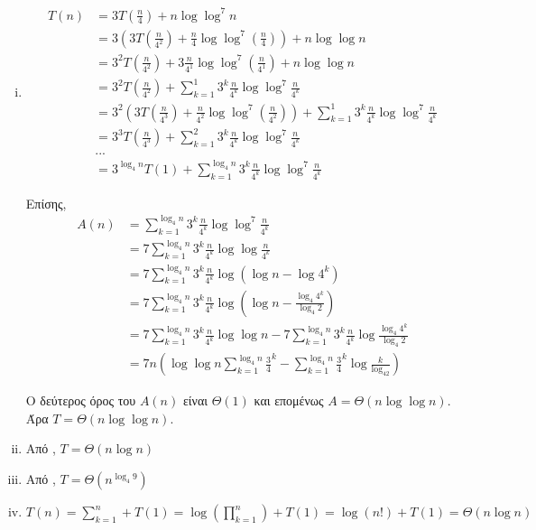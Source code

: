 \begin{enumerate}[(i)]

    \item \begin{align*} 
            T(n) &= 3T(\frac{n}{4}) + n\log\log^7n \\
                 &= 3(3T(\frac{n}{4^2}) + \frac{n}{4}\log\log^7(\frac{n}{4})) + n\log\log n \\
                 &= 3^2T(\frac{n}{4^2}) + 3\frac{n}{4^1}\log\log^7(\frac{n}{4^1}) + n\log\log n \\
                 &= 3^2T(\frac{n}{4^2}) + \sum_{k=1}^{1} 3^k\frac{n}{4^k}\log\log^7\frac{n}{4^k} \\
                 &= 3^2(3T(\frac{n}{4^3}) + \frac{n}{4^2}\log\log^7(\frac{n}{4^2})) + \sum_{k=1}^{1} 3^k\frac{n}{4^k}\log\log^7\frac{n}{4^k} \\
                 &= 3^3T(\frac{n}{4^3}) + \sum_{k=1}^{2} 3^k\frac{n}{4^k}\log\log^7\frac{n}{4^k} \\
                 &...\\
                 &= 3^{\log_4n}T(1) + \sum_{k=1}^{\log_4n}3^k\frac{n}{4^k}\log\log^7\frac{n}{4^k}
           \end{align*}

            Επίσης,
            \begin{align*}
            A(n) &= \sum_{k=1}^{\log_4n}3^k\frac{n}{4^k}\log\log^7\frac{n}{4^k} \\
                 &= 7\sum_{k=1}^{\log_4n}3^k\frac{n}{4^k}\log\log\frac{n}{4^k} \\
                 &= 7\sum_{k=1}^{\log_4n}3^k\frac{n}{4^k}\log(\log n - \log{4^k}) \\
                 &= 7\sum_{k=1}^{\log_4n}3^k\frac{n}{4^k}\log(\log n - \frac{\log_4{4^k}}{\log_4{2}}) \\
                 &= 7\sum_{k=1}^{\log_4n}3^k\frac{n}{4^k}\log\log n - 7\sum_{k=1}^{\log_4n}3^k\frac{n}{4^k}\log\frac{\log_4{4^k}}{\log_4{2}} \\
                 &= 7n(\log \log n \sum_{k=1}^{\log_4n} \frac34^k - \sum_{k=1}^{\log_4n}\frac34^k\log\frac{k}{\log_42})
            \end{align*}

            Ο δεύτερος όρος του $A(n)$ είναι $\Theta(1)$ και επομένως $A = \Theta(n\log\log n)$. Άρα $T = \Theta(n\log\log n)$.

    \item Από , $T = \Theta(n\log n)$
    \item Από , $T = \Theta(n^{\log_4{9}})$
    \item $ T(n) = \sum_{k=1}^n + T(1) = \log(\prod_{k=1}^n) + T(1) = \log(n!) + T(1) = \Theta(n\log n)$
\end{enumerate}




